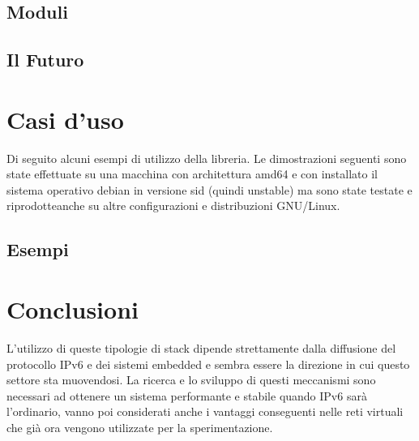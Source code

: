 \documentclass[14pt,a4paper,openright,twoside]{extreport}
\begin{document}
\section{Moduli}
\section{Il Futuro}
\clearpage{\pagestyle{empty}\cleardoublepage}

\chapter{Casi d'uso}                %
\lhead[\fancyplain{}{\bfseries\thepage}]{\fancyplain{}{\bfseries\rightmark}}
Di seguito alcuni esempi di utilizzo della libreria.
Le dimostrazioni seguenti sono state effettuate su una macchina con architettura amd64 e con installato il sistema operativo debian in versione sid (quindi unstable) ma sono state testate e riprodotteanche su altre configurazioni e distribuzioni GNU/Linux.

\section{Esempi}                 %

\clearpage{\pagestyle{empty}\cleardoublepage}


\chapter*{Conclusioni}
L'utilizzo di queste tipologie di stack dipende strettamente dalla diffusione del protocollo IPv6 e dei sistemi embedded e sembra essere la direzione in cui questo settore sta muovendosi.
La ricerca e lo sviluppo di questi meccanismi sono necessari ad ottenere un sistema performante e stabile quando IPv6 sar\`a l'ordinario, vanno poi considerati anche i vantaggi conseguenti nelle reti virtuali che gi\`a ora vengono utilizzate per la sperimentazione.
\end{document}
